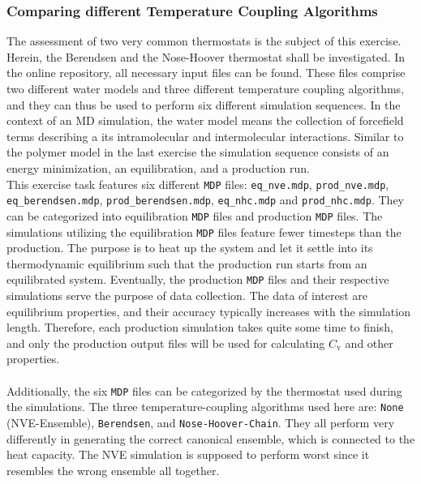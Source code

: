 \documentclass[9pt,tutorial]{livecoms}
\newcommand{\code}[1]{\colorbox{light-gray}{\texttt{#1}}}
\begin{document}
\subsubsection*{Comparing different Temperature Coupling Algorithms}
The assessment of two very common thermostats is the subject of this exercise. Herein, the Berendsen and the Nose-Hoover thermostat\cite{Nos1983,Nos1984,Hoover1985} shall be investigated. In the online repository, all necessary input files can be found. These files comprise two different water models and three different temperature coupling algorithms, and they can thus be used to perform six different simulation sequences. In the context of an MD simulation, the water model means the collection of forcefield terms describing a its intramolecular and intermolecular interactions. Similar to the polymer model in the last exercise the simulation sequence consists of an energy minimization, an equilibration, and a production run.\cite{Braun_2019}\\
This exercise task features six different \texttt{MDP} files: \code{eq\_nve.mdp}, \code{prod\_nve.mdp}, \code{eq\_berendsen.mdp}, \code{prod\_berendsen.mdp}, \code{eq\_nhc.mdp} and \code{prod\_nhc.mdp}. They can be categorized into equilibration \texttt{MDP} files and production \texttt{MDP} files. The simulations utilizing the equilibration \texttt{MDP} files feature fewer timesteps than the production. The purpose is to heat up the system and let it settle into its thermodynamic equilibrium such that the production run starts from an equilibrated system. Eventually, the production \texttt{MDP} files and their respective simulations serve the purpose of data collection. The data of interest are equilibrium properties, and their accuracy typically increases with the simulation length. Therefore, each production simulation takes quite some time to finish, and only the production output files will be used for calculating $C_\text{v}$ and other properties. \\ \\
Additionally, the six \texttt{MDP} files can be categorized by the thermostat used during the simulations. The three temperature-coupling algorithms used here are: \texttt{None} (NVE-Ensemble), \texttt{Berendsen}, and \texttt{Nose-Hoover-Chain}. They all perform very differently in generating the correct canonical ensemble, which is connected to the heat capacity. The NVE simulation is supposed to perform worst since it resembles the wrong ensemble all together.\\
\end{document}

